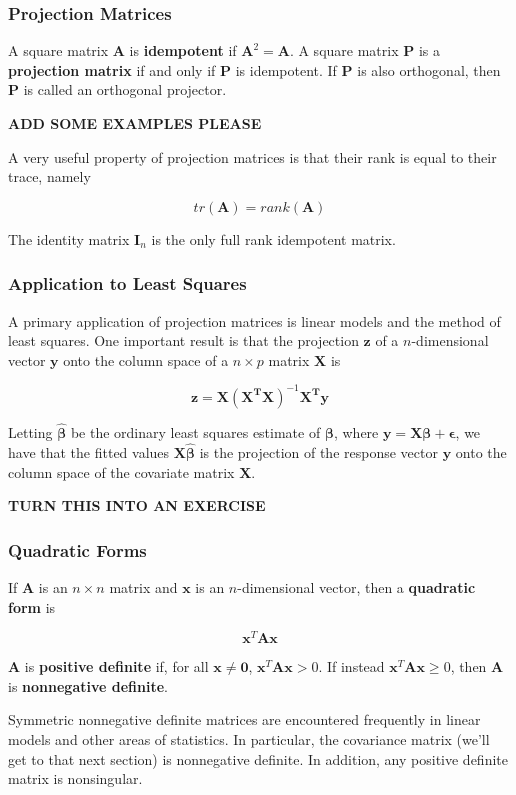 \documentclass{beamer}
\begin{document}
\begin{frame}
\frametitle{Projection Matrices}
A square matrix $\mathbf{A}$ is \textbf{idempotent} if $\mathbf{A}^2 = \mathbf{A}$.  A square matrix $\mathbf{P}$ is a \textbf{projection matrix} if and only if $\mathbf{P}$ is idempotent.  If $\mathbf{P}$ is also orthogonal, then $\mathbf{P}$ is called an orthogonal projector.

\textbf{ADD SOME EXAMPLES PLEASE}

\vspace{5mm}

A very useful property of projection matrices is that their rank is equal to their trace, namely

\[tr(\mathbf{A}) = rank(\mathbf{A})\]

The identity matrix $\mathbf{I}_n$ is the only full rank idempotent matrix.  
\end{frame}

\begin{frame}
\frametitle{Application to Least Squares}
A primary application of projection matrices is linear models and the method of least squares.  One important result is that the projection $\mathbf{z}$ of a $n$-dimensional vector $\mathbf{y}$ onto the column space of a $n \times p$ matrix $\mathbf{X}$ is

\[\mathbf{z} = \mathbf{X(X^TX)}^{-1}\mathbf{X^Ty}\]

Letting $\mathbf{\hat{\beta}}$ be the ordinary least squares estimate of $\mathbf{\beta}$, where $\mathbf{y} = \mathbf{X\beta} + \mathbf{\epsilon}$, we have that the fitted values $\mathbf{X}\hat{\mathbf{\beta}}$ is the projection of the response vector $\mathbf{y}$ onto the column space of the covariate matrix $\mathbf{X}$.

\textbf{TURN THIS INTO AN EXERCISE}

\end{frame}

\begin{frame}
\frametitle{Quadratic Forms}
If $\mathbf{A}$ is an $n \times n$ matrix and $\mathbf{x}$ is an $n$-dimensional vector, then a \textbf{quadratic form} is 

\[\mathbf{x}^T\mathbf{Ax}\]

$\mathbf{A}$ is \textbf{positive definite} if, for all $\mathbf{x} \neq \mathbf{0}$, $\mathbf{x}^T\mathbf{Ax} > 0$.  If instead $\mathbf{x}^T\mathbf{Ax} \geq 0$, then $\mathbf{A}$ is \textbf{nonnegative definite}.
\vspace{5mm}

Symmetric nonnegative definite matrices are encountered frequently in linear models and other areas of statistics.  In particular, the covariance matrix (we'll get to that next section) is nonnegative definite.  In addition, any positive definite matrix is nonsingular.

\end{frame}
\end{document}
